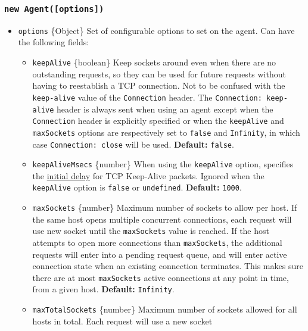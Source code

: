 \subsubsection{\texorpdfstring{\texttt{new\ Agent({[}options{]})}}{new Agent({[}options{]})}}\label{new-agentoptions}

\begin{itemize}
\tightlist
\item
  \texttt{options} \{Object\} Set of configurable options to set on the
  agent. Can have the following fields:

  \begin{itemize}
  \tightlist
  \item
    \texttt{keepAlive} \{boolean\} Keep sockets around even when there
    are no outstanding requests, so they can be used for future requests
    without having to reestablish a TCP connection. Not to be confused
    with the \texttt{keep-alive} value of the \texttt{Connection}
    header. The \texttt{Connection:\ keep-alive} header is always sent
    when using an agent except when the \texttt{Connection} header is
    explicitly specified or when the \texttt{keepAlive} and
    \texttt{maxSockets} options are respectively set to \texttt{false}
    and \texttt{Infinity}, in which case \texttt{Connection:\ close}
    will be used. \textbf{Default:} \texttt{false}.
  \item
    \texttt{keepAliveMsecs} \{number\} When using the \texttt{keepAlive}
    option, specifies the
    \href{net.md\#socketsetkeepaliveenable-initialdelay}{initial delay}
    for TCP Keep-Alive packets. Ignored when the \texttt{keepAlive}
    option is \texttt{false} or \texttt{undefined}. \textbf{Default:}
    \texttt{1000}.
  \item
    \texttt{maxSockets} \{number\} Maximum number of sockets to allow
    per host. If the same host opens multiple concurrent connections,
    each request will use new socket until the \texttt{maxSockets} value
    is reached. If the host attempts to open more connections than
    \texttt{maxSockets}, the additional requests will enter into a
    pending request queue, and will enter active connection state when
    an existing connection terminates. This makes sure there are at most
    \texttt{maxSockets} active connections at any point in time, from a
    given host. \textbf{Default:} \texttt{Infinity}.
  \item
    \texttt{maxTotalSockets} \{number\} Maximum number of sockets
    allowed for all hosts in total. Each request will use a new socket

\end{itemize}
\end{itemize}
